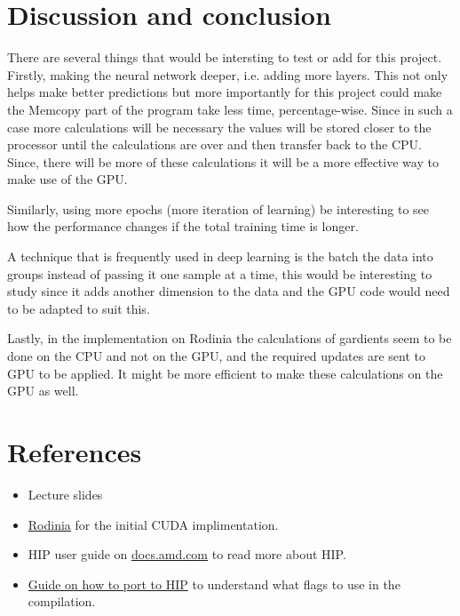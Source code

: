 \documentclass[a4paper,11pt]{scrartcl}
\begin{document}
\section{Discussion and conclusion}

There are several things that would be intersting to test or add for this project. Firstly, making the neural network deeper, i.e. adding more layers. This not only helps make better predictions but more importantly for this project could make the Memcopy part of the program take less time, percentage-wise. Since in such a case more calculations will be necessary the values will be stored closer to the processor until the calculations are over and then transfer back to the CPU. Since, there will be more of these calculations it will be a more effective way to make use of the GPU.

Similarly, using more epochs (more iteration of learning) be interesting to see how the performance changes if the total training time is longer.

A technique that is frequently used in deep learning is the batch the data into groups instead of passing it one sample at a time, this would be interesting to study since it adds another dimension to the data and the GPU code would need to be adapted to suit this.

Lastly, in the implementation on Rodinia the calculations of gardients seem to be done on the CPU and not on the GPU, and the required updates are sent to GPU to be applied. It might be more efficient to make these calculations on the GPU as well.


\section{References}
\begin{itemize}
  \item Lecture slides
  \item \href{http://lava.cs.virginia.edu/Rodinia/download.htm}{Rodinia} for the initial CUDA implimentation.
  \item HIP user guide on \href{https://docs.amd.com}{docs.amd.com} to read more about HIP.
  \item \href{https://doc-sep4.readthedocs.io/en/latest/Programming_Guides/HIP-porting-guide.html}{Guide on how to port to HIP} to understand what flags to use in the compilation.
\end{itemize}
\end{document}
